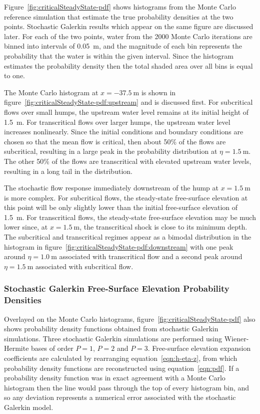 Figure~\ref{fig:criticalSteadyState-pdf} shows histograms from the Monte Carlo reference simulation that estimate the true probability densities at the two points.
Stochastic Galerkin results which appear on the same figure are discussed later.
For each of the two points, water  from the 2000 Monte Carlo iterations are binned into intervals of \SI{0.05}{\meter}, and the magnitude of each bin represents the probability that the water  is within the given interval.
Since the histogram estimates the probability density then the total shaded area over all bins is equal to one.

The Monte Carlo histogram at $x = \SI{-37.5}{\meter}$ is shown in figure~\ref{fig:criticalSteadyState-pdf:upstream} and is discussed first.
For subcritical flows over small humps, the upstream water level remains at its initial height of \SI{1.5}{\meter}.
For transcritical flows over larger humps, the upstream water level increases nonlinearly.
Since the initial conditions and boundary conditions are chosen so that the mean flow is critical, then about 50\% of the flows are subcritical, resulting in a large peak in the
probability distribution at $\eta = \SI{1.5}{\meter}$.
The other 50\% of the flows are transcritical with elevated upstream water levels, resulting in a long tail in the distribution.

The stochastic flow response immediately downstream of the hump at $x = \SI{1.5}{\meter}$ is more complex.
For subcritical flows, the steady-state free-surface elevation at this point will be only slightly lower than the initial free-surface elevation of \SI{1.5}{\meter}.
For transcritical flows, the steady-state free-surface elevation may be much lower since,  at $x = \SI{1.5}{\meter}$, the transcritical shock is close to its minimum depth.
The subcritical and transcritical regimes appear as a bimodal distribution in the histogram in figure~\ref{fig:criticalSteadyState-pdf:downstream} with one peak around $\eta = \SI{1.0}{\meter}$ associated with transcritical flow and a second peak around $\eta = \SI{1.5}{\meter}$ associated with subcritical flow.

\subsubsection{Stochastic Galerkin Free-Surface Elevation Probability Densities}
Overlayed on the Monte Carlo histograms, figure~\ref{fig:criticalSteadyState-pdf} also shows probability density functions obtained from stochastic Galerkin simulations.
Three stochastic Galerkin simulations are performed using Wiener-Hermite bases of order $P=1$, $P=2$ and $P=3$.
Free-surface elevation expansion coefficients are calculated by rearranging equation~\eqref{eqn:h-eta-z}, from which probability density functions are reconstructed using equation~\eqref{eqn:pdf}.
If a probability density function was in exact agreement with a Monte Carlo histogram then the line would pass through the top of every histogram bin, and so any deviation represents a numerical error associated with the stochastic Galerkin model.


